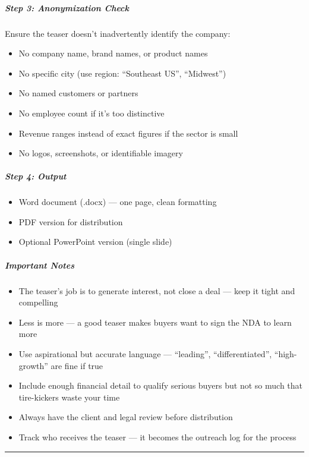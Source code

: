 \documentclass[11pt]{article}
\begin{document}
\subparagraph{Step 3: Anonymization Check}\mbox{}\par

Ensure the teaser doesn't inadvertently identify the company:

\begin{itemize}[leftmargin=*,itemsep=2pt,topsep=2pt]
\item {} No company name, brand names, or product names
\item {} No specific city (use region: ``Southeast US'', ``Midwest'')
\item {} No named customers or partners
\item {} No employee count if it's too distinctive
\item {} Revenue ranges instead of exact figures if the sector is small
\item {} No logos, screenshots, or identifiable imagery
\end{itemize}

\subparagraph{Step 4: Output}\mbox{}\par

\begin{itemize}[leftmargin=*,itemsep=2pt,topsep=2pt]
\item {} Word document (.docx) — one page, clean formatting
\item {} PDF version for distribution
\item {} Optional PowerPoint version (single slide)
\end{itemize}

\subparagraph{Important Notes}\mbox{}\par

\begin{itemize}[leftmargin=*,itemsep=2pt,topsep=2pt]
\item {} The teaser's job is to generate interest, not close a deal — keep it tight and compelling
\item {} Less is more — a good teaser makes buyers want to sign the NDA to learn more
\item {} Use aspirational but accurate language — ``leading'', ``differentiated'', ``high-growth'' are fine if true
\item {} Include enough financial detail to qualify serious buyers but not so much that tire-kickers waste your time
\item {} Always have the client and legal review before distribution
\item {} Track who receives the teaser — it becomes the outreach log for the process
\end{itemize}

\vspace{0.8em}\hrule\vspace{0.8em}
\end{document}
